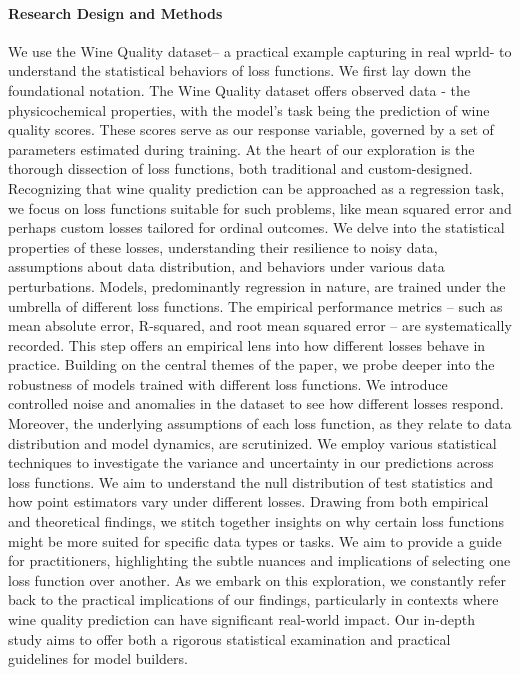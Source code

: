 \documentclass[12pt]{article}
\begin{document}
\paragraph{Research Design and Methods}
We use the Wine Quality dataset– a practical example capturing in real wprld- to understand the statistical behaviors of loss functions. We first lay down the foundational notation. The Wine Quality dataset offers observed data - the physicochemical properties, with the model's task being the prediction of wine quality scores. These scores serve as our response variable, governed by a set of parameters estimated during training. At the heart of our exploration is the thorough dissection of loss functions, both traditional and custom-designed. Recognizing that wine quality prediction can be approached as a regression task, we focus on loss functions suitable for such problems, like mean squared error and perhaps custom losses tailored for ordinal outcomes. We delve into the statistical properties of these losses, understanding their resilience to noisy data, assumptions about data distribution, and behaviors under various data perturbations. Models, predominantly regression in nature, are trained under the umbrella of different loss functions. The empirical performance metrics – such as mean absolute error, R-squared, and root mean squared error – are systematically recorded. This step offers an empirical lens into how different losses behave in practice. Building on the central themes of the paper, we probe deeper into the robustness of models trained with different loss functions. We introduce controlled noise and anomalies in the dataset to see how different losses respond. Moreover, the underlying assumptions of each loss function, as they relate to data distribution and model dynamics, are scrutinized. We employ various statistical techniques to investigate the variance and uncertainty in our predictions across loss functions. We aim to understand the null distribution of test statistics and how point estimators vary under different losses. Drawing from both empirical and theoretical findings, we stitch together insights on why certain loss functions might be more suited for specific data types or tasks. We aim to provide a guide for practitioners, highlighting the subtle nuances and implications of selecting one loss function over another. As we embark on this exploration, we constantly refer back to the practical implications of our findings, particularly in contexts where wine quality prediction can have significant real-world impact. Our in-depth study aims to offer both a rigorous statistical examination and practical guidelines for model builders. 
\end{document}
